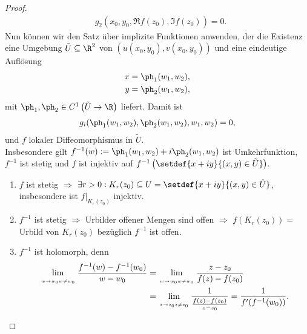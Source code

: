 \begin{proof}
\begin{align*}
&g_2(x_0,y_0,\Re f(z_0), \Im f(z_0)) = 0.
\end{align*}
Nun können wir den Satz über implizite Funktionen anwenden, der die Existenz
eine Umgebung $\tilde{U}\subseteq \R^2$ von $\left(u(x_0,y_0),v(x_0,y_0)\right)$
und eine eindeutige Auflösung
\begin{align*}
x &= \ph_1(w_1,w_2),\\
y &= \ph_2(w_1,w_2),
\end{align*}
mit $\ph_1,\ph_2\in C^1\left(\tilde{U}\to\R\right)$ liefert. Damit ist
\begin{align*}
g_i(\ph_1(w_1,w_2),\ph_2(w_1,w_2),w_1,w_2) = 0,
\end{align*}
und $f$ lokaler Diffeomorphismus in $\tilde{U}$.\\
Insbesondere gilt $f^{-1}(w) := \ph_1(w_1,w_2)+i\ph_2(w_1,w_2)$ ist Umkehrfunktion, $f^{-1}$ ist
stetig und $f$ ist injektiv auf
$f^{-1}\left(\setdef{x+iy}{(x,y)\in\tilde{U}}\right)$.
\begin{enumerate}
  \item $f$ ist stetig $\Rightarrow$ $\exists r > 0 : K_r(z_0)\subseteq U =
  \setdef{x+iy}{(x,y)\in \hat{U}}$, insbesondere ist $f\big|_{K_r(z_0)}$
  injektiv.
  \item $f^{-1}$ ist stetig $\Rightarrow$ Urbilder offener Mengen sind offen
  $\Rightarrow$ $f(K_r(z_0)) = $ Urbild von $K_r(z_0)$ bezüglich $f^{-1}$ ist
  offen.
  \item $f^{-1}$ ist holomorph, denn
  \begin{align*}
  \lim\limits_{\atop{w\to w_0}{w\neq w_0}} \frac{f^{-1}(w)-f^{-1}(w_0)}{w-w_0}
  &= \lim\limits_{\atop{w\to w_0}{w\neq w_0}} \frac{z-z_0}{f(z)-f(z_0)}
  \\ &= \lim\limits_{\atop{z\to z_0}{z\neq z_0}}
  \frac{1}{\frac{f(z)-f(z_0)}{z-z_0}} = \frac{1}{f'(f^{-1}(w_0))}.\qedhere
  \end{align*}
\end{enumerate}
\end{proof}

